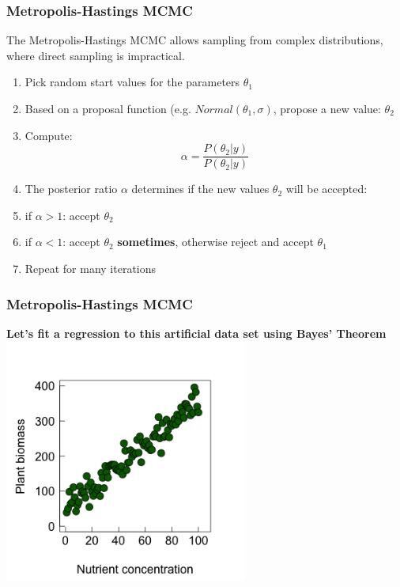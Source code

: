 \documentclass{beamer}
\begin{document}
\begin{frame}
    \frametitle{Metropolis-Hastings MCMC}
    The Metropolis-Hastings MCMC allows sampling from complex distributions, where direct sampling is impractical.
    \begin{enumerate}
        \item Pick random start values for the parameters $\theta_1$
        \item Based on a proposal function (e.g. $Normal(\theta_1, \sigma)$, propose a new value: $\theta_2$
        \item Compute: \[\alpha = \frac{P(\theta_2|y)}{P(\theta_2|y)}\]
        \item The posterior ratio $\alpha$ determines if the new values $\theta_2$ will be accepted:
        \item[] if $\alpha > 1$: accept $\theta_2$
        \item[] if $\alpha < 1$: accept $\theta_2$ \textbf{sometimes}, otherwise reject and accept $\theta_1$
        \item Repeat for many iterations
    \end{enumerate}
\end{frame}

\begin{frame}
    \frametitle{Metropolis-Hastings MCMC}
    \begin{center}
        \large\textbf{Let's fit a regression to this artificial data set using Bayes' Theorem}\\
        \includegraphics[width=0.6\textwidth]{lectures/day_11_bayesian_lm/figures/unnamed-chunk-7-1.png}
    \end{center}
\end{frame}
\end{document}
